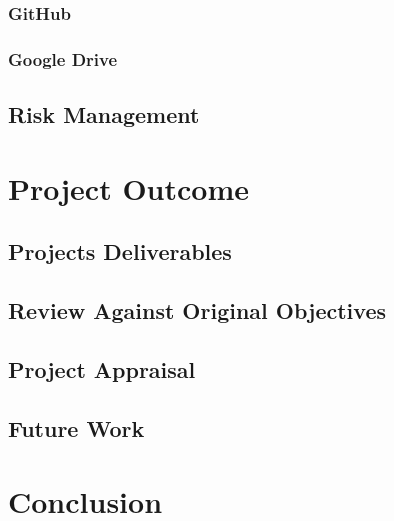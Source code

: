 \documentclass[12pt,a4paper,twoside]{report}
\begin{document}
		\subsection{GitHub}
		\subsection{Google Drive}
	\section{Risk Management}

\chapter{Project Outcome}
	\section{Projects Deliverables}
	\section{Review Against Original Objectives}
	\section{Project Appraisal}
	\section{Future Work}

\chapter{Conclusion}



\end{document}
